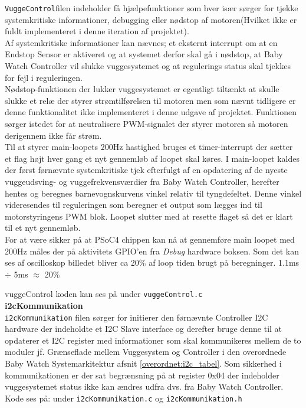 \verb+VuggeControl+filen indeholder få hjælpefunktioner som hver især sørger for tjekke systemkritiske informationer, debugging eller nødstop af motoren(Hvilket ikke er fuldt implementeret i denne iteration af projektet). \\

Af systemkritiske informationer kan nævnes; et eksternt interrupt om at en Endstop Sensor er aktiveret og at systemet derfor skal gå i nødstop, at Baby Watch Controller vil slukke vuggesystemet og at regulerings status skal tjekkes for fejl i reguleringen.\\ 

Nødstop-funktionen der lukker vuggesystemet er egentligt tiltænkt at skulle slukke et relæ der styrer strømtilførelsen til motoren men som nævnt tidligere er denne funktionalitet ikke implementeret i denne udgave af projektet. Funktionen sørger istedet for at neutralisere PWM-signalet der styrer motoren så motoren derigennem ikke får strøm. \\ 

Til at styrer main-loopets 200Hz hastighed bruges et timer-interrupt der sætter et flag højt hver gang et nyt gennemløb af loopet skal køres. I main-loopet kaldes der først førnævnte systemkritiske tjek efterfulgt af en opdatering af de nyeste vuggeudsving- og vuggefrekvensværdier fra Baby Watch Controller, herefter hentes og beregnes barnevognskurvens vinkel relativ til tyngdefeltet. Denne vinkel videresendes til reguleringen som beregner et output som lægges ind til motorstyringens PWM blok. Loopet slutter med at resette flaget så det er klart til et nyt gennemløb. \\
For at være sikker på at PSoC4 chippen kan nå at gennemføre main loopet med 200Hz måles der på aktivitets GPIO'en fra \textit{Debug} hardware boksen.
Som det kan ses af oscilloskop billedet bliver ca 20\% af loop tiden brugt på beregninger. 1.1ms $\div$ 5ms $\approx$ 20\%

vuggeControl koden kan ses på \citep{cd} under \verb+vuggeControl.c+ \\

\label{vugsys:impl, i2cKommunikation}\textbf{i2cKommunikation} \\ \verb+i2cKommunikation+ filen sørger for initierer den førnævnte Controller I2C hardware der indeholdte et I2C Slave interface og derefter bruge denne til at opdaterer et I2C register med informationer som skal kommunikeres mellem de to moduler jf. Grænseflade mellem Vuggesystem og Controller i den overordnede Baby Watch Systemarkitektur afsnit \ref{overordnet:i2c_tabel}. Som sikkerhed i kommunikationen er der sat begrænsning på at register 0x04 der indeholder vuggesystemet status ikke kan ændres udfra dvs. fra Baby Watch Controller. Kode ses på: \citep{cd} under \verb+i2cKommunikation.c+ og \verb+i2cKommunikation.h+\\

